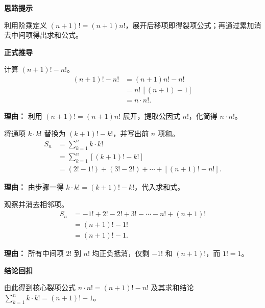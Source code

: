 \begin{proofbox}

	\textbf{\textcolor{CProof}{思路提示}}

	利用阶乘定义 $(n+1)!=(n+1)n!$，展开后移项即得裂项公式；再通过累加消去中间项得出求和公式。

	\medskip
	\textbf{\textcolor{CProof}{正式推导}}
	\begin{description}[style=nextline, leftmargin=2.8em, labelsep=0.5em, itemsep=0.55em]
		\item[\textbf{步骤一（裂项变形）：}] 计算 $(n+1)!-n!$。
			\[
				\begin{aligned}
					(n+1)!-n!
					&= (n+1)n! - n! \\
					&= n!\,[(n+1)-1] \\
					&= n\cdot n!.
			\end{aligned}
			\]
			\par\textbf{理由：} 利用 $(n+1)!=(n+1)n!$ 展开，提取公因式 $n!$，化简得 $n\cdot n!$。

		\item[\textbf{步骤二（累加消项）：}] 将通项 $k\cdot k!$ 替换为 $(k+1)!-k!$，并写出前 $n$ 项和。
			\[
				\begin{aligned}
					S_n
					&= \sum_{k=1}^{n} k\cdot k! \\
					&= \sum_{k=1}^{n} [(k+1)! - k!] \\
					&= (2!-1!)+(3!-2!)+\cdots+[(n+1)!-n!].
			\end{aligned}
			\]
			\par\textbf{理由：} 由步骤一得 $k\cdot k!=(k+1)!-k!$，代入求和式。

		\item[\textbf{步骤三（合并结果）：}] 观察并消去相邻项。
			\[
				\begin{aligned}
					S_n
					&= -1! + 2! - 2! + 3! - \cdots - n! + (n+1)! \\
					&= (n+1)! - 1! \\
					&= (n+1)! - 1.
			\end{aligned}
			\]
			\par\textbf{理由：} 所有中间项 $2!$ 到 $n!$ 均正负抵消，仅剩 $-1!$ 和 $(n+1)!$，而 $1!=1$。
	\end{description}

	\medskip
	\textbf{\textcolor{CProof}{结论回扣}}

	由此得到核心裂项公式 $n\cdot n!=(n+1)!-n!$ 及其求和结论 $\displaystyle\sum_{k=1}^{n} k\cdot k! = (n+1)!-1$。

\end{proofbox}
